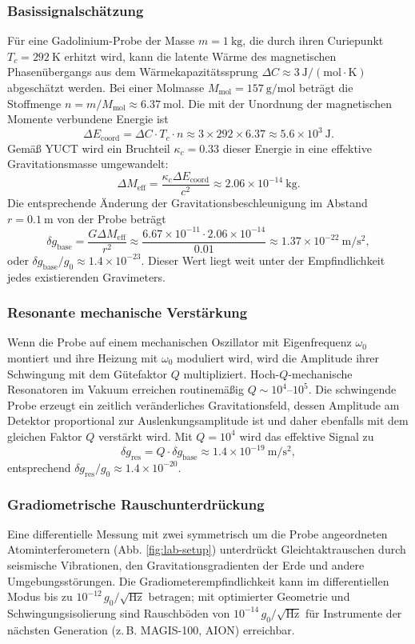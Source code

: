 \documentclass[12pt]{article}
\theoremstyle{remark}
\begin{document}
	\subsubsection{Basissignalschätzung}
	Für eine Gadolinium-Probe der Masse \(m = 1\ \mathrm{kg}\), die durch ihren Curiepunkt \(T_c = 292\ \mathrm{K}\) erhitzt wird, kann die latente Wärme des magnetischen Phasenübergangs aus dem Wärmekapazitätssprung \(\Delta C \approx 3\ \mathrm{J/(mol\cdot K)}\) abgeschätzt werden. Bei einer Molmasse \(M_{\mathrm{mol}} = 157\ \mathrm{g/mol}\) beträgt die Stoffmenge \(n = m / M_{\mathrm{mol}} \approx 6.37\ \mathrm{mol}\). Die mit der Unordnung der magnetischen Momente verbundene Energie ist
	\[
	\Delta E_{\mathrm{coord}} = \Delta C \cdot T_c \cdot n \approx 3 \times 292 \times 6.37 \approx 5.6\times10^{3}\ \mathrm{J}.
	\]
	Gemäß YUCT wird ein Bruchteil \(\kappa_c = 0.33\) dieser Energie in eine effektive Gravitationsmasse umgewandelt:
	\[
	\Delta M_{\mathrm{eff}} = \frac{\kappa_c \Delta E_{\mathrm{coord}}}{c^2} \approx 2.06\times10^{-14}\ \mathrm{kg}.
	\]
	Die entsprechende Änderung der Gravitationsbeschleunigung im Abstand \(r = 0.1\ \mathrm{m}\) von der Probe beträgt
	\[
	\delta g_{\mathrm{base}} = \frac{G \Delta M_{\mathrm{eff}}}{r^2} \approx \frac{6.67\times10^{-11} \cdot 2.06\times10^{-14}}{0.01} \approx 1.37\times10^{-22}\ \mathrm{m/s^2},
	\]
	oder \(\delta g_{\mathrm{base}}/g_0 \approx 1.4\times10^{-23}\). Dieser Wert liegt weit unter der Empfindlichkeit jedes existierenden Gravimeters.
	
	\subsubsection{Resonante mechanische Verstärkung}
	Wenn die Probe auf einem mechanischen Oszillator mit Eigenfrequenz \(\omega_0\) montiert und ihre Heizung mit \(\omega_0\) moduliert wird, wird die Amplitude ihrer Schwingung mit dem Gütefaktor \(Q\) multipliziert. Hoch-\(Q\)-mechanische Resonatoren im Vakuum erreichen routinemäßig \(Q \sim 10^4\)–\(10^5\). Die schwingende Probe erzeugt ein zeitlich veränderliches Gravitationsfeld, dessen Amplitude am Detektor proportional zur Auslenkungsamplitude ist und daher ebenfalls mit dem gleichen Faktor \(Q\) verstärkt wird. Mit \(Q = 10^4\) wird das effektive Signal zu
	\[
	\delta g_{\mathrm{res}} = Q \cdot \delta g_{\mathrm{base}} \approx 1.4\times10^{-19}\ \mathrm{m/s^2},
	\]
	entsprechend \(\delta g_{\mathrm{res}}/g_0 \approx 1.4\times10^{-20}\).
	
	\subsubsection{Gradiometrische Rauschunterdrückung}
	Eine differentielle Messung mit zwei symmetrisch um die Probe angeordneten Atominterferometern (Abb. \ref{fig:lab-setup}) unterdrückt Gleichtaktrauschen durch seismische Vibrationen, den Gravitationsgradienten der Erde und andere Umgebungsstörungen. Die Gradiometerempfindlichkeit kann im differentiellen Modus bis zu \(10^{-12}\,g_0/\sqrt{\mathrm{Hz}}\) betragen; mit optimierter Geometrie und Schwingungsisolierung sind Rauschböden von \(10^{-14}\,g_0/\sqrt{\mathrm{Hz}}\) für Instrumente der nächsten Generation (z. B. MAGIS-100, AION) erreichbar.
	
\end{document}
